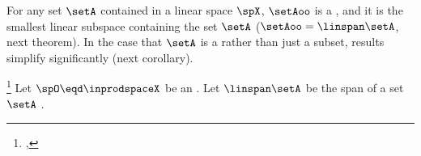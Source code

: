 For any set $\setA$ contained in a linear space $\spX$, 
$\setAoo$ is a , and it 
is the smallest linear subspace containing the set $\setA$ ($\setAoo=\linspan\setA$, next theorem).
In the case that $\setA$ is a  rather than just a subset,
results simplify significantly (next corollary).
\begin{theorem}
\footnote{
  ,
  }
\label{thm:inprod_orthog}
Let  $\spO\eqd\inprodspaceX$ be an  .
Let $\linspan\setA$ be the span of a set $\setA$ .
\end{theorem}
